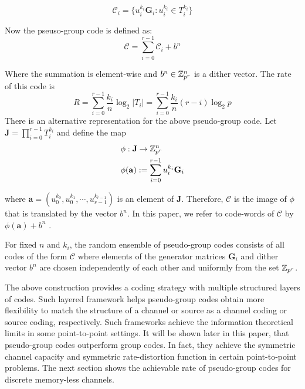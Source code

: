 \documentclass[conference]{IEEEtran}
\theoremstyle{plain}
\theoremstyle{definition}
\theoremstyle{remark}
\begin{document}
\begin{equation}\label{eq: pseudo group codes layer i}
\mathcal{C}_i=\{ u_i^{k_i}\mathbf{G}_i: u_i^{k_i}\in T_i^{k_i}\}
\end{equation}

Now the pseuso-group code is defined as:
\begin{equation}\label{eq: pseudo group codes}
\mathcal{C}=\sum_{i=0}^{r-1} \mathcal{C}_i+b^n
\end{equation}

Where the summation is element-wise and $b^n\in \mathbb{Z}_{p^r}^n$ is a dither vector. The rate of this code is  
\begin{equation}
R=\sum_{i=0}^{r-1} \frac{k_i}{n} \log_2 |T_i| = \sum_{i=0}^{r-1} \frac{k_i}{n} (r-i) \log_2 p
\end{equation}
There is an alternative representation for the above pseudo-group code. Let $\mathbf{J}=\prod_{i=0}^{r-1}T_i^{k_i}$ and define the map 
\begin{align}\label{eq: phi}
&\phi :\mathbf{J} \rightarrow \mathbb{Z}_{p^r}^n\\\nonumber
& \phi(\mathbf{a}):=\sum_{i=0}^{r-1} u_i^{k_i}\mathbf{G}_i 
\end{align}

where $\mathbf{a}=(u_0^{k_0},u_0^{k_1}, \cdots, u_{r-1}^{k_{r-1}})$ is an element of $\mathbf{J}$. Therefore, $\mathcal{C}$ is the image of $\phi$ that is translated by the vector $b^n$. In this paper,  we refer to code-words of $\mathcal{C}$ by $\phi(\mathbf{a})+b^n$ .

For fixed $n$ and $k_i$, the random ensemble of pseudo-group codes consists of all codes of the form $\mathcal{C}$ where elements of the generator matrices $\mathbf{G}_i$ and dither vector $b^n$ are chosen independently of each other and uniformly from the set $\mathbb{Z}_{p^r}$.


The above construction provides a coding strategy with multiple structured layers of codes. Such layered framework helps pseudo-group codes obtain more flexibility to match the structure of a channel or source as a channel coding or source coding, respectively. Such frameworks achieve the information theoretical limits in some point-to-point settings. It will be shown later in this paper, that pseudo-group codes outperform group codes. In fact, they achieve the symmetric channel capacity and symmetric rate-distortion function in certain point-to-point problems. The next section shows the achievable rate of pseudo-group codes for discrete memory-less channels.  
\end{document}
